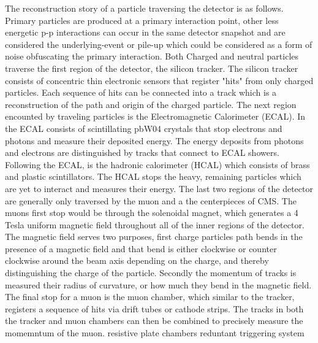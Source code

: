 The reconstruction story of a particle traversing the detector is as follows. Primary particles are produced at a primary interaction point, other less energetic p-p interactions can occur in the same detector snapshot and are considered the underlying-event or pile-up which could be considered as a form of noise obfuscating the primary interaction. Both Charged and neutral particles traverse the first region of the detector, the silicon tracker. The silicon tracker consists of concentric thin electronic sensors that register "hits" from only charged particles. Each sequence of hits can be connected into a track which is a reconstruction of the path and origin of the charged particle.  The next region encounted by traveling particles is the Electromagnetic Calorimeter (ECAL). In the ECAL consists of scintillating pbW04 crystals that stop electrons and photons and measure their deposited energy. The energy deposits from photons and electrons are distinguished by tracks that connect to ECAL showers. Following the ECAL, is the hadronic calorimeter (HCAL) which consists of brass and plastic scintillators. The HCAL stops the heavy, remaining particles which are yet to interact and measures their energy. The last two regions of the detector are generally only traversed by the muon and a the centerpieces of CMS. The muons first stop would be through the solenoidal magnet, which generates a 4 Tesla uniform magnetic field throughout all of the inner regions of the detector. The magnetic field serves two purposes, first charge particles path bends in the presence of a magnetic field and that bend is either clockwise or counter clockwise around the beam axis depending on the charge, and thereby distinguishing the charge of the particle.  Secondly the momentum of tracks is measured their radius of curvature, or how much they bend in the magnetic field. The final stop for a muon is the muon chamber, which similar to the tracker, registers a sequence of hits via drift tubes or cathode strips. The tracks in both the tracker and muon chambers can then be combined to precisely measure the momemntum of the muon. resistive plate chambers reduntant triggering system 




